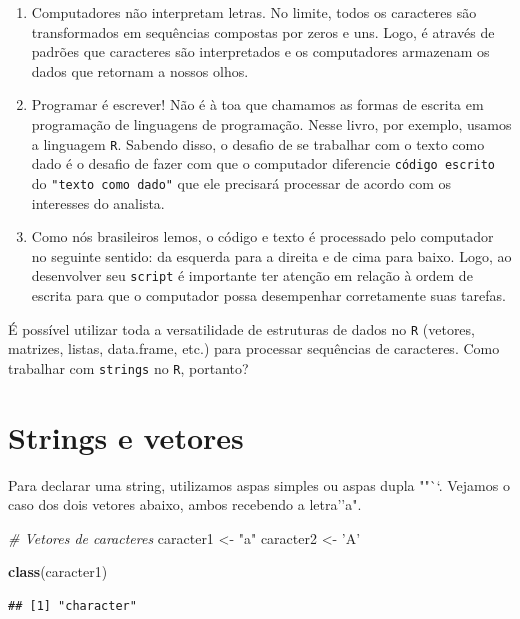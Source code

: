 \documentclass[]{book}
\newenvironment{Shaded}{\begin{snugshade}}{\end{snugshade}}
\newcommand{\CommentTok}[1]{\textcolor[rgb]{0.56,0.35,0.01}{\textit{#1}}}
\newcommand{\KeywordTok}[1]{\textcolor[rgb]{0.13,0.29,0.53}{\textbf{#1}}}
\newcommand{\NormalTok}[1]{#1}
\newcommand{\StringTok}[1]{\textcolor[rgb]{0.31,0.60,0.02}{#1}}
\begin{document}
\begin{enumerate}
\def\labelenumi{\arabic{enumi}.}
\item
  Computadores não interpretam letras. No limite, todos os caracteres são transformados em sequências compostas por zeros e uns. Logo, é através de padrões que caracteres são interpretados e os computadores armazenam os dados que retornam a nossos olhos.
\item
  Programar é escrever! Não é à toa que chamamos as formas de escrita em programação de linguagens de programação. Nesse livro, por exemplo, usamos a linguagem \texttt{R}. Sabendo disso, o desafio de se trabalhar com o texto como dado é o desafio de fazer com que o computador diferencie \texttt{código\ escrito} do \texttt{"texto\ como\ dado"} que ele precisará processar de acordo com os interesses do analista.
\item
  Como nós brasileiros lemos, o código e texto é processado pelo computador no seguinte sentido: da esquerda para a direita e de cima para baixo. Logo, ao desenvolver seu \texttt{script} é importante ter atenção em relação à ordem de escrita para que o computador possa desempenhar corretamente suas tarefas.
\end{enumerate}

É possível utilizar toda a versatilidade de estruturas de dados no \texttt{R} (vetores, matrizes, listas, data.frame, etc.) para processar sequências de caracteres. Como trabalhar com \texttt{strings} no \texttt{R}, portanto?

\hypertarget{strings-e-vetores}{%
\section{Strings e vetores}\label{strings-e-vetores}}

Para declarar uma string, utilizamos aspas simples \texttt{\textquotesingle{}} ou aspas dupla ""``. Vejamos o caso dos dois vetores abaixo, ambos recebendo a letra''a".

\begin{Shaded}
\begin{Highlighting}[]
\CommentTok{# Vetores de caracteres }
\NormalTok{caracter1 <-}\StringTok{ "a"}
\NormalTok{caracter2 <-}\StringTok{ 'A'}

\KeywordTok{class}\NormalTok{(caracter1)}
\end{Highlighting}
\end{Shaded}

\begin{verbatim}
## [1] "character"
\end{verbatim}
\end{document}
